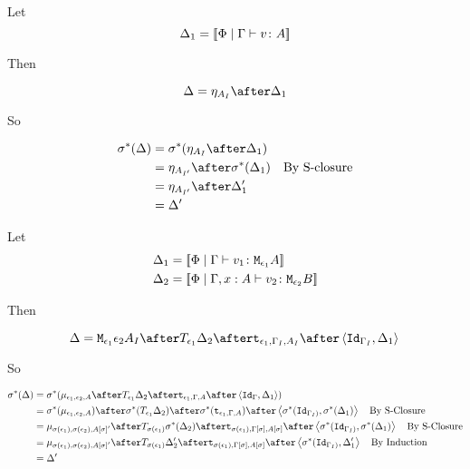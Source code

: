 {
Let \begin{equation}
    \Delta_1 = {\bf [\![}\Phi\mid\Gamma \vdash v \colon A{\bf ]\!]}
\end{equation}

Then

\begin{equation}
    \D = \point{A_I}\after \D_1\\
\end{equation}

So

\begin{align}
    \si\star(\D) &= \si\star(\point{A_I}\after \D_1)\\
            & = \point{A_{I'}} \after\si\star(\D_1)\qt{By S-closure}\\
            & = \point{A_{I'}} \after\D_1'\\
            & = \D'
\end{align}

Let \begin{align}
    \Delta_1 &= {\bf [\![}\Phi\mid\Gamma \vdash v_1 \colon \texttt{M}_{\epsilon_1}{A}{\bf ]\!]}\\
    \Delta_2 &= {\bf [\![}\Phi\mid\Gamma, x: A \vdash v_2 \colon \texttt{M}_{\epsilon_2}{B}{\bf ]\!]}
\end{align}

Then

\begin{equation}
    \D = \M{\e_1}{\e_2}{A_I}\after\T{\e_1}{\D_2}\after\tstrength{\e_1}{\G_I}{A_I}\after\pr{\Id{\G_{I}}}{\D_1}\\
\end{equation}

So

\begin{align}
    \si\star(\D) &= \si\star(\bind{\e_1}{\e_2}{A}\after\T{\e_1}{\D_2}\after\tstrength{\e_1}{\G}{A}\after\pr{\Id{\G}}{\D_1})\\
    & = \si\star(\bind{\e_1}{\e_2}{A})\after\si\star(\T{\e_1}{\D_2})\after\si\star(\tstrength{\e_1}{\G}{A})\after\pr{\si\star(\Id{\G_{I})}}{\si\star(\D_1)}\qt{By S-Closure}\\
    &= \bind{\si(\e_1)}{\si(\e_2)}{A\ssi'}\after\T{\si(\e_1)}{\si\star(\D_2)}\after\tstrength{\si(\e_1)}{\G\ssi}{A\ssi}\after\pr{\si\star(\Id{\G_{I})}}{\si\star(\D_1)}\qt{By S-Closure}\\
    &= \bind{\si(\e_1)}{\si(\e_2)}{A\ssi'}\after\T{\si(\e_1)}{\D_2'}\after\tstrength{\si(\e_1)}{\G\ssi}{A\ssi}\after\pr{\si\star(\Id{\G_{I})}}{\D_1'}\qt{By Induction}\\
    &= \D'\\
\end{align}

}
